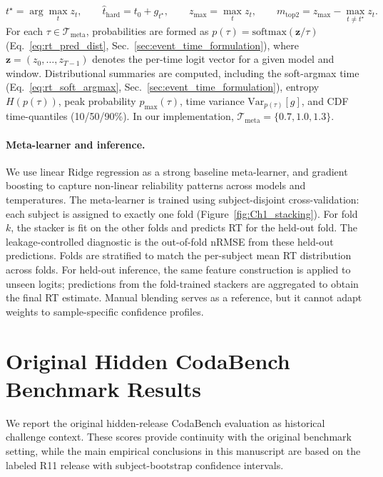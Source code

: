 \documentclass[12pt]{article}
\begin{document}
\begin{equation}
\label{eq:rt_stacking_logit_features}
t^\star = \arg\max_{t} z_t,\qquad
\hat t_{\mathrm{hard}} = t_0 + g_{t^\star},\qquad
z_{\max} = \max_t z_t,\qquad
m_{\mathrm{top2}} = z_{\max} - \max_{t\neq t^\star} z_t.
\end{equation}
For each $\tau\in\mathcal{T}_{\text{meta}}$, probabilities are formed as $p(\tau)=\mathrm{softmax}(\mathbf{z}/\tau)$ (Eq.~\ref{eq:rt_pred_dist}, Sec.~\ref{sec:event_time_formulation}), where $\mathbf{z}=(z_0,\dots,z_{T-1})$ denotes the per-time logit vector for a given model and window. Distributional summaries
are computed, including the soft-argmax time (Eq.~\ref{eq:rt_soft_argmax}, Sec.~\ref{sec:event_time_formulation}), entropy $H(p(\tau))$, peak probability
$p_{\max}(\tau)$, time variance $\mathrm{Var}_{p(\tau)}[g]$, and CDF time-quantiles (10/50/90\%). In our implementation,
$\mathcal{T}_{\text{meta}}=\{0.7,1.0,1.3\}$.

\paragraph{Meta-learner and inference.}
We use linear Ridge regression as a strong baseline meta-learner, and gradient boosting to capture non-linear reliability
patterns across models and temperatures. The meta-learner is trained using subject-disjoint cross-validation: each subject is assigned to exactly one fold (Figure~\ref{fig:Ch1_stacking}). For fold $k$, the stacker is fit on the other folds and predicts RT for the held-out fold. The leakage-controlled diagnostic is the out-of-fold nRMSE from these held-out predictions. Folds are stratified to match the per-subject mean RT distribution across folds. For held-out inference, the same feature construction is applied to unseen logits; predictions from the fold-trained stackers are aggregated to obtain the final RT estimate.
Manual blending serves as a reference, but it cannot adapt weights to sample-specific confidence profiles.

\section{Original Hidden CodaBench Benchmark Results}

We report the original hidden-release CodaBench evaluation as historical challenge context. These scores provide continuity with the original benchmark setting, while the main empirical conclusions in this manuscript are based on the labeled R11 release with subject-bootstrap confidence intervals.
\end{document}

